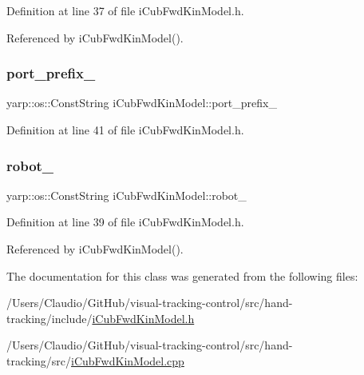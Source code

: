 Definition at line 37 of file i\+Cub\+Fwd\+Kin\+Model.\+h.



Referenced by i\+Cub\+Fwd\+Kin\+Model().

\mbox{\label{classiCubFwdKinModel_a294f61787264b6a3e9dc1eb9dbc72ed0}} 
\subsubsection{\texorpdfstring{port\+\_\+prefix\+\_\+}{port\_prefix\_}}
{\footnotesize\ttfamily yarp\+::os\+::\+Const\+String i\+Cub\+Fwd\+Kin\+Model\+::port\+\_\+prefix\+\_\+\hspace{0.3cm}{\ttfamily [private]}}



Definition at line 41 of file i\+Cub\+Fwd\+Kin\+Model.\+h.

\mbox{\label{classiCubFwdKinModel_ad0fec4635ff934435b24d717cb553014}} 
\subsubsection{\texorpdfstring{robot\+\_\+}{robot\_}}
{\footnotesize\ttfamily yarp\+::os\+::\+Const\+String i\+Cub\+Fwd\+Kin\+Model\+::robot\+\_\+\hspace{0.3cm}{\ttfamily [private]}}



Definition at line 39 of file i\+Cub\+Fwd\+Kin\+Model.\+h.



Referenced by i\+Cub\+Fwd\+Kin\+Model().



The documentation for this class was generated from the following files\+:\begin{DoxyCompactItemize}
\item 
/\+Users/\+Claudio/\+Git\+Hub/visual-\/tracking-\/control/src/hand-\/tracking/include/\hyperlink{iCubFwdKinModel_8h}{i\+Cub\+Fwd\+Kin\+Model.\+h}\item 
/\+Users/\+Claudio/\+Git\+Hub/visual-\/tracking-\/control/src/hand-\/tracking/src/\hyperlink{iCubFwdKinModel_8cpp}{i\+Cub\+Fwd\+Kin\+Model.\+cpp}\end{DoxyCompactItemize}
